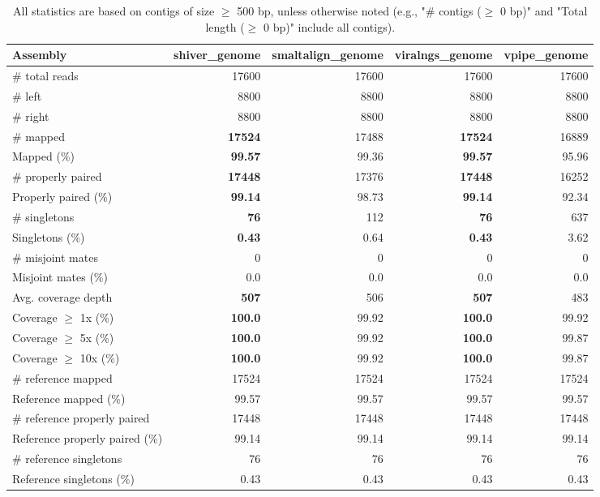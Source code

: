\documentclass[12pt,a4paper]{article}
\begin{document}
\begin{table}[ht]
\begin{center}
\caption{All statistics are based on contigs of size $\geq$ 500 bp, unless otherwise noted (e.g., "\# contigs ($\geq$ 0 bp)" and "Total length ($\geq$ 0 bp)" include all contigs).}
\begin{tabular}{|l*{4}{|r}|}
\hline
Assembly & shiver\_genome & smaltalign\_genome & viralngs\_genome & vpipe\_genome \\ \hline
\# total reads & 17600 & 17600 & 17600 & 17600 \\ \hline
\# left & 8800 & 8800 & 8800 & 8800 \\ \hline
\# right & 8800 & 8800 & 8800 & 8800 \\ \hline
\# mapped & {\bf 17524} & 17488 & {\bf 17524} & 16889 \\ \hline
Mapped (\%) & {\bf 99.57} & 99.36 & {\bf 99.57} & 95.96 \\ \hline
\# properly paired & {\bf 17448} & 17376 & {\bf 17448} & 16252 \\ \hline
Properly paired (\%) & {\bf 99.14} & 98.73 & {\bf 99.14} & 92.34 \\ \hline
\# singletons & {\bf 76} & 112 & {\bf 76} & 637 \\ \hline
Singletons (\%) & {\bf 0.43} & 0.64 & {\bf 0.43} & 3.62 \\ \hline
\# misjoint mates & 0 & 0 & 0 & 0 \\ \hline
Misjoint mates (\%) & 0.0 & 0.0 & 0.0 & 0.0 \\ \hline
Avg. coverage depth & {\bf 507} & 506 & {\bf 507} & 483 \\ \hline
Coverage $\geq$ 1x (\%) & {\bf 100.0} & 99.92 & {\bf 100.0} & 99.92 \\ \hline
Coverage $\geq$ 5x (\%) & {\bf 100.0} & 99.92 & {\bf 100.0} & 99.87 \\ \hline
Coverage $\geq$ 10x (\%) & {\bf 100.0} & 99.92 & {\bf 100.0} & 99.87 \\ \hline
\# reference mapped & 17524 & 17524 & 17524 & 17524 \\ \hline
Reference mapped (\%) & 99.57 & 99.57 & 99.57 & 99.57 \\ \hline
\# reference properly paired & 17448 & 17448 & 17448 & 17448 \\ \hline
Reference properly paired (\%) & 99.14 & 99.14 & 99.14 & 99.14 \\ \hline
\# reference singletons & 76 & 76 & 76 & 76 \\ \hline
Reference singletons (\%) & 0.43 & 0.43 & 0.43 & 0.43 \\ \hline

\end{tabular}
\end{center}
\end{table}
\end{document}
